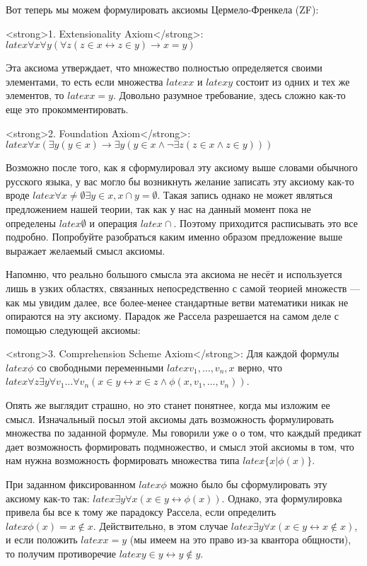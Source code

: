 Вот теперь мы можем формулировать аксиомы Цермело-Френкела (ZF):

<strong>1. Extensionality Axiom</strong>: $latex \forall x \forall y (\forall z (z \in x \leftrightarrow z \in y) \rightarrow x = y)$

Эта аксиома утверждает, что множество полностью определяется своими элементами, то есть если множества $latex x$ и $latex y$ состоит из одних и тех же элементов, то $latex x=y$. Довольно разумное требование, здесь сложно как-то еще это прокомментировать.

<strong>2. Foundation Axiom</strong>: $latex \forall x(\exists y (y\in x)\rightarrow \exists y(y\in x\wedge \neg \exists z (z\in x \wedge z\in y)))$

Возможно после того, как я сформулировал эту аксиому выше словами обычного русского языка, у вас могло бы возникнуть желание записать эту аксиому как-то вроде $latex \forall x \not= \emptyset \exists y\in x, x\cap y = \emptyset$. Такая запись однако не может являться предложением нашей теории, так как у нас на данный момент пока не определены $latex \emptyset$ и операция $latex \cap$. Поэтому приходится расписывать это все подробно. Попробуйте разобраться каким именно образом предложение выше выражает желаемый смысл аксиомы.

Напомню, что реально большого смысла эта аксиома не несёт и используется лишь в узких областях, связанных непосредственно с самой теорией множеств — как мы увидим далее, все более-менее стандартные ветви математики никак не опираются на эту аксиому. Парадок же Рассела разрешается на самом деле с помощью следующей аксиомы:

<strong>3. Comprehension Scheme Axiom</strong>: Для каждой формулы $latex \phi$ со свободными переменными $latex v_1, \ldots, v_n, x$ верно, что $latex \forall z \exists y \forall v_1 \ldots \forall v_n (x\in y \leftrightarrow x \in z \wedge \phi(x, v_1, \ldots, v_n))$.

Опять же выглядит страшно, но это станет понятнее, когда мы изложим ее смысл. Изначальный посыл этой аксиомы дать возможность формулировать множества по заданной формуле. Мы говорили уже о о том, что каждый предикат дает возможность формировать подмножество, и смысл этой аксиомы в том, что нам нужна возможность формировать множества типа $latex \{x|\phi(x)\}$.

При заданном фиксированном $latex \phi$ можно было бы сформулировать эту аксиому как-то так: $latex \exists y \forall x (x\in y \leftrightarrow \phi(x))$. Однако, эта формулировка привела бы все к тому же парадоксу Рассела, если определить $latex \phi(x) = x \not \in x$. Действительно, в этом случае $latex \exists y \forall x (x\in y \leftrightarrow x\not \in x)$, и если положить $latex x=y$ (мы имеем на это право из-за квантора общности), то получим противоречие $latex y \in y \leftrightarrow y\not \in y$.

